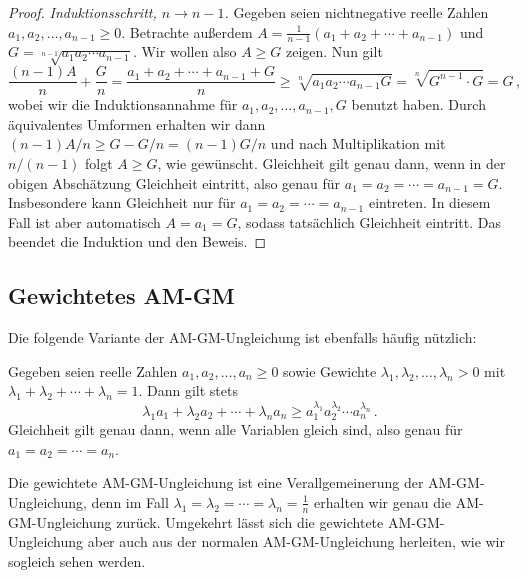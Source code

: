 \begin{proof}
	\emph{Induktionsschritt, $n\rightarrow n-1$.} Gegeben seien nichtnegative reelle Zahlen $a_1,a_2,\dotsc,a_{n-1}\geqslant 0$. Betrachte außerdem $A=\frac1{n-1}(a_1+a_2+\dotsb+a_{n-1})$ und $G=\sqrt[n-1]{a_1a_2\dotsm a_{n-1}}$. Wir wollen also $A\geqslant G$ zeigen. Nun gilt
	\begin{equation*}
		\frac{(n-1)A}{n}+\frac{G}{n}=\frac{a_1+a_2+\dotsb+a_{n-1}+G}{n}\geqslant \sqrt[n]{a_1a_2\dotsm a_{n-1}G}=\sqrt[n]{G^{n-1}\cdot G}=G\,,
	\end{equation*}
	wobei wir die Induktionsannahme für $a_1,a_2,\dotsc,a_{n-1},G$ benutzt haben. Durch äquivalentes Umformen erhalten wir dann $(n-1)A/n\geqslant G-G/n=(n-1)G/n$ und nach Multiplikation mit $n/(n-1)$ folgt $A\geqslant G$, wie gewünscht. Gleichheit gilt genau dann, wenn in der obigen Abschätzung Gleichheit eintritt, also genau für $a_1=a_2=\dotsb=a_{n-1}=G$. Insbesondere kann Gleichheit nur für $a_1=a_2=\dotsb=a_{n-1}$ eintreten. In diesem Fall ist aber automatisch $A=a_1=G$, sodass tatsächlich Gleichheit eintritt. Das beendet die Induktion und den Beweis.
\end{proof}

\subsection*{Gewichtetes AM-GM}
Die folgende Variante der AM-GM-Ungleichung ist ebenfalls häufig nützlich:
\begin{satzmitnamen}
	Gegeben seien reelle Zahlen $a_1,a_2,\dotsc,a_n\geqslant 0$ sowie Gewichte $\lambda_1,\lambda_2,\dotsc,\lambda_n> 0$ mit $\lambda_1+\lambda_2+\dotsb+\lambda_n=1$. Dann gilt stets
	\begin{equation*}
		\lambda_1a_1+\lambda_2a_2+\dotsb+\lambda_na_n\geqslant a_1^{\lambda_1}a_2^{\lambda_2}\dotsm a_n^{\lambda_n}\,.
	\end{equation*}
	Gleichheit gilt genau dann, wenn alle Variablen gleich sind, also genau für $a_1=a_2=\dotsb=a_n$.
\end{satzmitnamen}
Die gewichtete AM-GM-Ungleichung ist eine Verallgemeinerung der AM-GM-Ungleichung, denn im Fall $\lambda_1=\lambda_2=\dotsb=\lambda_n=\frac1n$ erhalten wir genau die AM-GM-Ungleichung zurück. Umgekehrt lässt sich die gewichtete AM-GM-Ungleichung aber auch aus der normalen AM-GM-Ungleichung herleiten, wie wir sogleich sehen werden.

